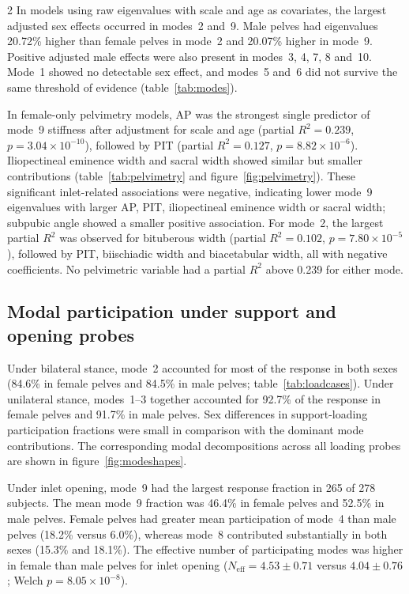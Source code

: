 \documentclass[openacc]{rsproca_new}
\begin{document}
\begin{multicols}{2}
In models using raw eigenvalues with scale and age as covariates, the largest adjusted sex effects occurred in modes~2 and~9. Male pelves had eigenvalues 20.72\% higher than female pelves in mode~2 and 20.07\% higher in mode~9. Positive adjusted male effects were also present in modes~3, 4, 7, 8 and~10. Mode~1 showed no detectable sex effect, and modes~5 and~6 did not survive the same threshold of evidence (table~\ref{tab:modes}).

In female-only pelvimetry models, AP was the strongest single predictor of mode~9 stiffness after adjustment for scale and age (partial $R^2=0.239$, $p=3.04 \times 10^{-10}$), followed by PIT (partial $R^2=0.127$, $p=8.82 \times 10^{-6}$). Iliopectineal eminence width and sacral width showed similar but smaller contributions (table~\ref{tab:pelvimetry} and figure~\ref{fig:pelvimetry}). These significant inlet-related associations were negative, indicating lower mode~9 eigenvalues with larger AP, PIT, iliopectineal eminence width or sacral width; subpubic angle showed a smaller positive association. For mode~2, the largest partial $R^2$ was observed for bituberous width (partial $R^2=0.102$, $p=7.80 \times 10^{-5}$), followed by PIT, biischiadic width and biacetabular width, all with negative coefficients. No pelvimetric variable had a partial $R^2$ above 0.239 for either mode.

\subsection{Modal participation under support and opening probes}

Under bilateral stance, mode~2 accounted for most of the response in both sexes (84.6\% in female pelves and 84.5\% in male pelves; table~\ref{tab:loadcases}). Under unilateral stance, modes~1--3 together accounted for 92.7\% of the response in female pelves and 91.7\% in male pelves. Sex differences in support-loading participation fractions were small in comparison with the dominant mode contributions. The corresponding modal decompositions across all loading probes are shown in figure~\ref{fig:modeshapes}.

Under inlet opening, mode~9 had the largest response fraction in 265 of 278 subjects. The mean mode~9 fraction was 46.4\% in female pelves and 52.5\% in male pelves. Female pelves had greater mean participation of mode~4 than male pelves (18.2\% versus 6.0\%), whereas mode~8 contributed substantially in both sexes (15.3\% and 18.1\%). The effective number of participating modes was higher in female than male pelves for inlet opening ($N_{\mathrm{eff}}=4.53\pm0.71$ versus $4.04\pm0.76$; Welch $p=8.05\times10^{-8}$).


\end{multicols}
\end{document}
